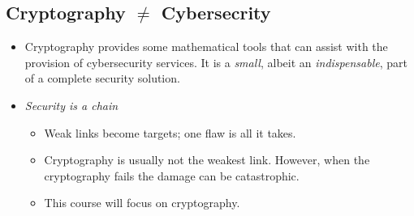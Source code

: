 \subsection*{Cryptography $ \neq $ Cybersecrity}
\begin{itemize}
    \item Cryptography provides some mathematical tools that can
          assist with the provision of cybersecurity services. It is a \emph{small},
          albeit an \emph{indispensable}, part of a complete security solution.
    \item \emph{Security is a chain}
          \begin{itemize}
              \item Weak links become targets; one flaw is all it takes.
              \item Cryptography is usually not the weakest link. However,
                    when the cryptography fails the damage can be catastrophic.
              \item This course will focus on cryptography.
          \end{itemize}
\end{itemize}

